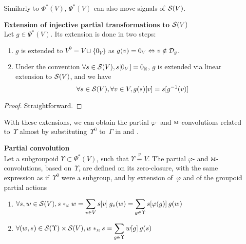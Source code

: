 Similarly to $\Phi^*(V)$, $\Psi^*(V)$ can also move signals of $\cs(V)$.

\begin{lemma}\textbf{Extension of injective partial transformations to $\cs(V)$}\\
Let $g \in \Psi^*(V)$. Its extension is done in two steps:
\begin{enumerate}
  \item $g$ is extended to $V^0 = V \cup \{0_V\}$ as $g(v) = 0_V \Leftrightarrow v \notin \cd_g$.
  \item Under the convention $\forall s \in \cs(V), s[0_V] = 0_\bbr$, $g$ is extended via linear extension to $\cs(V)$, and we have
  \begin{gather*}
  \forall s \in \cs(V), \forall v \in V, g(s)[v] = s[g^{-1}(v)]
  \end{gather*}
\end{enumerate}
\end{lemma}
\begin{proof}
Straightforward.
\end{proof}

With these extensions, we can obtain the partial $\varphi$- and $\M$-convolutions related to~$\Upsilon$ almost by substituting~$\Upsilon^0$ to~$\Gamma$ in  and .

\begin{definition}\textbf{Partial convolution}\\
Let a subgroupoid $\Upsilon \subset \Psi^*(V)$, such that $\Upsilon \overset\varphi\equiv V$. The partial $\varphi$- and $\M$-convolutions, based on~$\Upsilon$, are defined on its zero-closure, with the same expression as if~$\Upsilon^0$ were a subgroup, and by extension of~$\varphi$ and of the groupoid partial actions \ie
\begin{enumerate}[label=(\roman*)]
  \item $\forall s, w \in \cs(V),
  			s \ast_\varphi w = \displaystyle\sum_{v \in V} s[v] \h{2} g_v(w) = \displaystyle\sum_{g \in \Upsilon} s[\varphi(g)] \h{2} g(w)$ \label{enum:i}
  \item $\forall (w,s) \in \cs(\Upsilon) \times \cs(V), w \ast_{\M} s  = \displaystyle\sum_{g \in \Upsilon} w[g] \h{2} g(s)$ \label{enum:ii}
\end{enumerate}
\end{definition}

